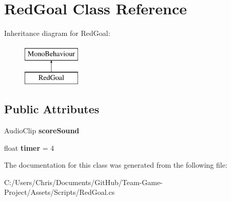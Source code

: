 \hypertarget{class_red_goal}{}\section{Red\+Goal Class Reference}
\label{class_red_goal}
Inheritance diagram for Red\+Goal\+:\begin{figure}[H]
\begin{center}
\leavevmode
\includegraphics[height=2.000000cm]{class_red_goal}
\end{center}
\end{figure}
\subsection*{Public Attributes}
\begin{DoxyCompactItemize}
\item 
Audio\+Clip {\bfseries score\+Sound}\hypertarget{class_red_goal_a860fb8e244ff5662f6972f291186df53}{}\label{class_red_goal_a860fb8e244ff5662f6972f291186df53}

\item 
float {\bfseries timer} = 4\hypertarget{class_red_goal_a480c87e7dead9c29cd82de7d155290a2}{}\label{class_red_goal_a480c87e7dead9c29cd82de7d155290a2}

\end{DoxyCompactItemize}


The documentation for this class was generated from the following file\+:\begin{DoxyCompactItemize}
\item 
C\+:/\+Users/\+Chris/\+Documents/\+Git\+Hub/\+Team-\/\+Game-\/\+Project/\+Assets/\+Scripts/Red\+Goal.\+cs\end{DoxyCompactItemize}
